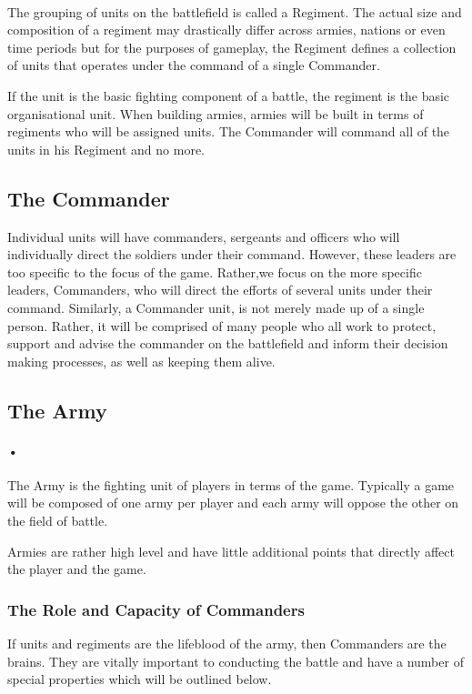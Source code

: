 \documentclass{article}
\begin{document}
\paragraph{}
The grouping of units on the battlefield is called a Regiment. The actual size and composition of a regiment may drastically differ across armies, nations or even time periods but for the purposes of gameplay, the Regiment defines a collection of units that operates under the command of a single Commander.

If the unit is the basic fighting component of a battle, the regiment is the basic organisational unit. When building armies, armies will be built in terms of regiments who will be assigned units. The Commander will command all of the units in his Regiment and no more.

\subsection{The Commander}
Individual units will have commanders, sergeants and officers who will individually direct the soldiers under their command. However, these leaders are too specific to the focus of the game. Rather,we focus on the more specific leaders, Commanders, who will direct the efforts of several units under their command. Similarly, a Commander unit, is not merely made up of a single person. Rather, it will be comprised of many people who all work to protect, support and advise the commander on the battlefield and inform their decision making processes, as well as keeping them alive.
\subsection{The Army}
\paragraph{•}
The Army is the fighting unit of players in terms of the game. Typically a game will be composed of one army per player and each army will oppose the other on the field of battle.

Armies are rather high level and have little additional points that directly affect the player and the game.
\subsubsection{The Role and Capacity of Commanders}
If units and regiments are the lifeblood of the army, then Commanders are the brains. They are vitally important to conducting the battle and have a number of special properties which will be outlined below.
\end{document}
